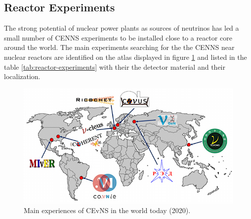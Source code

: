 \subsection{Reactor Experiments}

The strong potential of nuclear power plants as sources of neutrinos has led a small number of CENNS experiments to be installed close to a reactor core around the world. The main experiments searching for the the CENNS near nuclear reactors are identified on the atlas displayed in figure \ref{fig:cenns-exp-atlas} and listed in the table \ref{tab:reactor-experiments} with their the detector material and their localization.

\begin{figure}
\centering
\includegraphics[scale=1]{Figures/Introduction/cenns_exp_atlas.pdf}
\caption{Main experiences of CEvNS in the world today (2020).
}
\label{fig:cenns-exp-atlas}
\end{figure}


